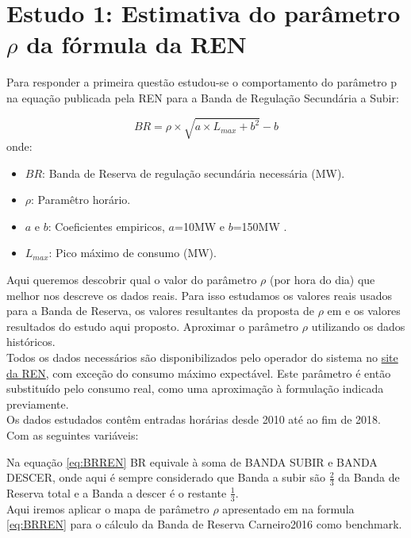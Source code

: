 \chapter{Estudo 1: Estimativa do parâmetro $\rho$ da fórmula da REN}



Para responder a primeira questão estudou-se o comportamento do parâmetro p na equação publicada pela \gls{REN} para a Banda de Regulação Secundária a Subir:

\begin{equation} \label{eq:BRREN} 
    BR = \rho \times \sqrt{a \times  L_{max} + b^{2}} - b 
\end{equation}
onde:
\begin{itemize}
  \item $BR$: Banda de Reserva  de regulação secundária necessária (MW).
  \item $\rho$: Paramêtro horário.
  \item $a$ e $b$: Coeficientes empiricos, $a$=10MW e $b$=150MW .
  \item $L_{max}$: Pico máximo de consumo (MW).
\end{itemize}

Aqui queremos descobrir qual o valor do parâmetro $\rho$ (por hora do dia) que melhor nos descreve os dados reais. Para isso estudamos os valores reais usados para a Banda de Reserva, os valores resultantes da proposta de $\rho$  em \cite{Carneiro2016} e os valores resultados do estudo aqui proposto. Aproximar o parâmetro $\rho$  utilizando os dados históricos. \\
Todos os dados necessários são disponibilizados pelo operador do sistema no \href{https://mercado.ren.pt/PT/Electr}{site da \gls{REN}}, com exceção do consumo máximo expectável. Este parâmetro é então substituído pelo consumo real, como uma aproximação à formulação indicada previamente.\\
Os dados estudados contêm entradas horárias desde 2010 até ao fim de 2018. Com as seguintes variáveis:\\

\begin{table}[H] \centering \caption{Dados REN}  \end{table}

Na equação \ref{eq:BRREN} BR equivale à soma de BANDA SUBIR e BANDA DESCER, onde aqui é sempre considerado que Banda a subir são $\frac{2}{3}$ da Banda de Reserva total e a Banda a descer é o restante $\frac{1}{3}$. \\
Aqui iremos aplicar o mapa de parâmetro $\rho$ apresentado em \cite{Carneiro2016} na formula \ref{eq:BRREN} para o cálculo da Banda de Reserva Carneiro2016 como benchmark. \\

